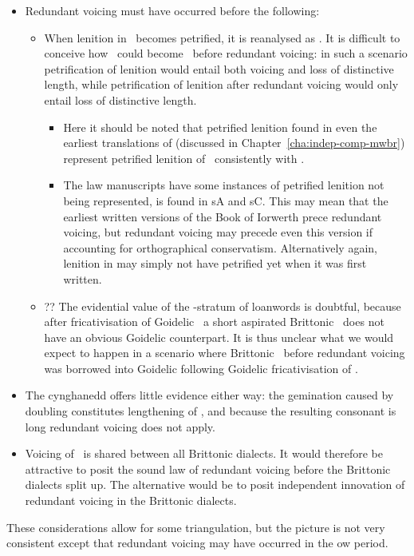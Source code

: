 \begin{itemize}
\item Redundant voicing must have occurred before the following:
  \begin{itemize}
  \item When lenition in \lT\ becomes petrified, it is reanalysed as \xD. It is difficult to conceive how \lT\ could become \xD\ before redundant voicing: in such a scenario petrification of lenition would entail both voicing and loss of distinctive length, while petrification of lenition after redundant voicing would only entail loss of distinctive length.
    \begin{itemize}
    \item Here it should be noted that petrified lenition found in
      even the earliest translations of 
      (discussed in Chapter~\ref{cha:indep-comp-mwbr}) represent
      petrified lenition of \lT\ consistently with .
    \item The law manuscripts have some instances of petrified
      lenition not being represented, \eg {} is found
      in \gls{sA} and \gls{sC}. This may mean that the earliest
      written versions of the Book of Iorwerth prece redundant
      voicing, but redundant voicing may precede even this version if
      accounting for orthographical conservatism. Alternatively again, 
      lenition in  may simply not have petrified yet when
      it was first written.
    \end{itemize}

  \item ?? The evidential value of the -stratum of loanwords is doubtful, because after fricativisation of Goidelic \lT\, a short aspirated Brittonic \lT\ does not have an obvious Goidelic counterpart. It is thus unclear what we would expect to happen in a scenario where Brittonic \lT\ before redundant voicing was borrowed into Goidelic following Goidelic fricativisation of \lT.
  \end{itemize}
  
\item The cynghanedd offers little evidence either way: the gemination caused by doubling constitutes lengthening of \lT, and because the resulting consonant is long redundant voicing does not apply.
\item Voicing of \lT\ is shared between all Brittonic dialects. It would therefore be attractive to posit the sound law of redundant voicing before the Brittonic dialects split up. The alternative would be to posit independent innovation of redundant voicing in the Brittonic dialects.
\end{itemize}
These considerations allow for some triangulation, but the picture is not very consistent except that redundant voicing may have occurred in the \gls{ow} period.


